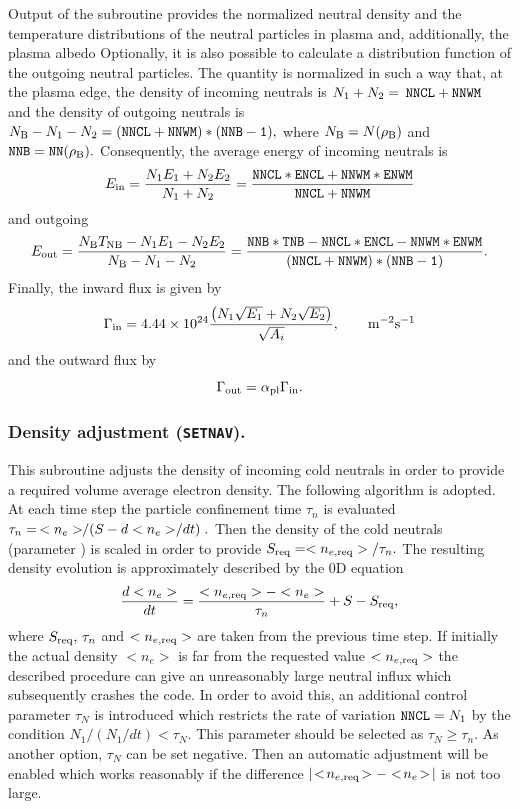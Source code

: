 Output of the subroutine  provides the normalized neutral
density  and the temperature 
distributions of the neutral particles in plasma and, additionally, the
plasma albedo   
Optionally, it is also possible to calculate a distribution function of
the outgoing neutral particles. 
The quantity  is normalized in such a way
that, at the plasma edge, the density of incoming neutrals is
$N_1+N_2=\hspace*{2pt}{\tt NNCL+NNWM}\hspace*{2pt}$ and the density of outgoing neutrals is
$N_{\rm B}-N_1-N_2=\tt(NNCL+NNWM)*(NNB-1),$ where
$N_{\rm B}=N(\rho_{\rm B})$ and ${\tt NNB}={\tt NN}(\rho_{\rm B}).$ 
Consequently, the average energy of incoming neutrals is
$$
E_{\rm in}=\frac{N_1E_1+N_2E_2}{N_1+N_2}
=\frac{\tt NNCL*ENCL+NNWM*ENWM}{\tt NNCL+NNWM}
$$
and outgoing
$$
E_{\rm out}=\frac{N_{\rm B}T_{\rm NB}-N_1E_1-N_2E_2}{N_{\rm B}-N_1-N_2}
=\frac{\tt NNB*TNB-NNCL*ENCL-NNWM*ENWM}{\tt(NNCL+NNWM)*(NNB-1)}
.$$
Finally, the inward flux is given by
$$
\Gamma_{\rm in}
=4.44\times10^{24}\displaystyle\frac{\left(N_1\sqrt{E_1}+N_2\sqrt{E_2}\right)}{\sqrt{A_i}}
,\qquad\rm m^{-2}s^{-1}
$$
and the outward flux by
$$
\Gamma_{\rm out}=\alpha_{\rm pl}\Gamma_{\rm in}
.$$
\subsubsection{Density adjustment ({\tt SETNAV}).}

This subroutine adjusts the density of incoming cold neutrals in order to
provide a required volume average electron density. 
The following algorithm is adopted.
At each time step the particle confinement time $\tau_n$ is evaluated 
$\tau_n=\,<n_e>\!\!\left/\left(S-{d<n_e>}/{dt}\right)\right..$
Then the density of the cold neutrals (parameter ) is scaled
in order to provide $S_{\rm req}=<n_{e,\rm req}>/\tau_n.$ 
The resulting density evolution is approximately described by the 0D
equation 
$$
\frac{d<n_e>}{dt}
=\frac{<n_{e,\rm req}>-<n_e>}{\tau_n}+S-S_{\rm req}
,$$
where $S_{\rm req},\,\tau_n$ and $<n_{e,\rm req}>$ are taken from the
previous time step.
If initially the actual density $<n_e>$ is far from the requested value 
$<n_{e,\rm req}>$ the described procedure can give an unreasonably large
neutral influx which subsequently crashes the code. 
In order to avoid this, an additional control parameter $\tau_N$ is
introduced which restricts the rate of variation 
${\tt NNCL}=N_1$ by the condition $N_1/(N_1/dt)<\tau_N.$
This parameter should be selected as $\tau_N\geq\tau_n.$
As another option, $\tau_N$ can be set negative. 
Then an automatic adjustment will be enabled which works reasonably if
the difference 
$|\!<\!n_{e,\rm req}\!>-<\!n_e\!>\!|$ is not too large.


